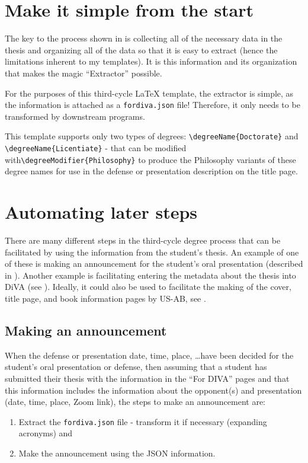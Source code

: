 \documentclass[12pt, twoside]{article}
\newcommand{\fname}[1]{\texttt{#1}}
\begin{document}
\section{Make it simple from the start}
\label{sec:makeItSimpleFromTheStart}

The key to the process shown in  is collecting all of the necessary data in the thesis and organizing all of the data so that it is easy to extract (hence the limitations inherent to my templates). It is this information and its organization that makes the magic \enquote{Extractor} possible.

For the purposes of this third-cycle \LaTeX{} template, the extractor is simple, as the information is attached as a \fname{fordiva.json} file! Therefore, it only needs to be transformed by downstream programs.

This template supports only two types of degrees: \texttt{\textbackslash degreeName\{Doctorate\}} and \texttt{\textbackslash degreeName\{Licentiate\}} - that can be modified with\linebreak[4] \texttt{\textbackslash degreeModifier\{Philosophy\}} to produce the Philosophy variants of these degree names for use in the defense or presentation description on the title page.


\section{Automating later steps}
\label{sec:AutomatingLaterSteps}
There are many different steps in the third-cycle degree process that can be facilitated by using the information from the student's thesis. An example of one of these is making an announcement for the student's oral presentation (described in ). Another example is facilitating entering the metadata about the thesis into \gls{DiVA} (see ). Ideally, it could also be used to facilitate the making of the cover, title page, and book information pages by US-AB, see .

\subsection{Making an announcement}
\label{sec:makingAnAnnouncement}
When the defense or presentation date, time, place, \ldots have been decided for the student's oral presentation or defense, then assuming that a student has submitted their thesis with the information in the \enquote{For DIVA} pages and that this information includes the information about the opponent(s) and presentation (\eg date, time, place, Zoom link), the steps to make an announcement are:
\begin{enumerate}
    \item Extract the \fname{fordiva.json} file - transform it if necessary (\eg expanding acronyms) and
    
    \item Make the announcement using the JSON information.
\end{enumerate}
\end{document}
